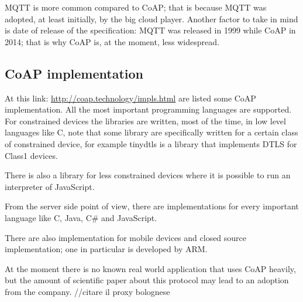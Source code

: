 	MQTT is more common compared to CoAP; that is because MQTT was adopted, at least initially, by the big cloud player.\newline
	Another factor to take in mind is date of release of the specification: MQTT was released in 1999 while CoAP in 2014; that is why CoAP is, at the moment, less widespread.\newline
	
	\subsection{CoAP implementation}
	At this link: \url{http://coap.technology/impls.html} are listed some CoAP implementation.\newline
	All the most important programming languages are supported.\newline
	For constrained devices the libraries are written, most of the time, in low level languages like C, note that some library are specifically written for a certain class of constrained device, for example tinydtls is a library that implements DTLS for Class1 devices.\newline
	
	There is also a library for less constrained devices where it is possible to run an interpreter of JavaScript.\newline
	
	From the server side point of view, there are implementations for every important language like C, Java, C\# and JavaScript.\newline
	
	There are also implementation for mobile devices and closed source implementation; one in particular is developed by ARM.\newline
	
	At the moment there is no known real world application that uses CoAP heavily, but the amount of scientific paper about this protocol may lead to an adoption from the company.
	\newline
	//citare il proxy bolognese